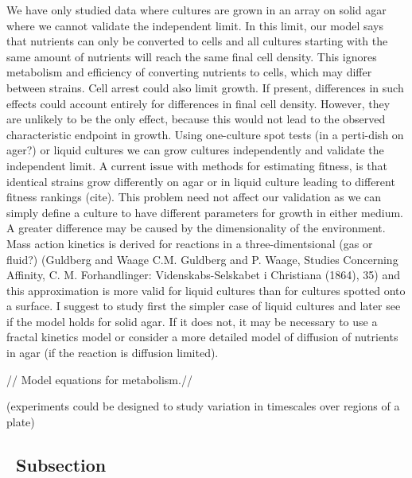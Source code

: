 We have only studied data where cultures are grown in an array on
solid agar where we cannot validate the independent limit. In this
limit, our model says that nutrients can only be converted to cells
and all cultures starting with the same amount of nutrients will reach
the same final cell density. This ignores metabolism and efficiency of
converting nutrients to cells, which may differ between strains. Cell
arrest could also limit growth. If present, differences in such
effects could account entirely for differences in final cell
density. However, they are unlikely to be the only effect, because
this would not lead to the observed characteristic endpoint in
growth. Using one-culture spot tests (in a perti-dish on ager?) or
liquid cultures we can grow cultures independently and validate the
independent limit. A current issue with methods for estimating
fitness, is that identical strains grow differently on agar or in
liquid culture leading to different fitness rankings (cite). This
problem need not affect our validation as we can simply define a
culture to have different parameters for growth in either medium. A
greater difference may be caused by the dimensionality of the
environment. Mass action kinetics is derived for reactions in a
three-dimentsional (gas or fluid?) (Guldberg and Waage C.M. Guldberg
and P. Waage, Studies Concerning Affinity, C. M. Forhandlinger:
Videnskabs-Selskabet i Christiana (1864), 35) and this approximation
is more valid for liquid cultures than for cultures spotted onto a
surface. I suggest to study first the simpler case of liquid cultures
and later see if the model holds for solid agar. If it does not, it
may be necessary to use a fractal kinetics model or consider a more
detailed model of diffusion of nutrients in agar (if the reaction is
diffusion limited).

// Model equations for metabolism.//


(experiments could be designed to study variation in timescales over
regions of a plate)


\subsection{\thesubsection~Subsection}

